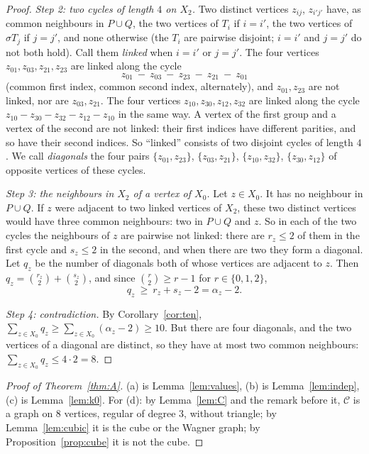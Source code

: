 \documentclass[11pt,a4paper]{article}
\theoremstyle{remark}
\newcommand{\sg}{\sigma}
\begin{document}
\begin{proof}
\medskip\noindent\emph{Step 2: two cycles of length $4$ on $X_2$.}
Two distinct vertices $z_{ij}$, $z_{i'j'}$ have, as common neighbours in $P\cup Q$, the two vertices of $T_i$ if
$i=i'$, the two vertices of $\sg T_j$ if $j=j'$, and none otherwise (the $T_i$ are pairwise disjoint; $i=i'$ and
$j=j'$ do not both hold). Call them \emph{linked} when $i=i'$ or $j=j'$. The four vertices
$z_{01},z_{03},z_{21},z_{23}$ are linked along the cycle
\[
z_{01}\ -\ z_{03}\ -\ z_{23}\ -\ z_{21}\ -\ z_{01}
\]
(common first index, common second index, alternately), and $z_{01},z_{23}$ are not linked, nor are
$z_{03},z_{21}$. The four vertices $z_{10},z_{30},z_{12},z_{32}$ are linked along the cycle
$z_{10}-z_{30}-z_{32}-z_{12}-z_{10}$ in the same way. A vertex of the first group and a vertex of the second are not
linked: their first indices have different parities, and so have their second indices. So ``linked'' consists of two
disjoint cycles of length $4$. We call \emph{diagonals} the four pairs
$\{z_{01},z_{23}\}$, $\{z_{03},z_{21}\}$, $\{z_{10},z_{32}\}$, $\{z_{30},z_{12}\}$ of opposite vertices of these
cycles.

\medskip\noindent\emph{Step 3: the neighbours in $X_2$ of a vertex of $X_0$.}
Let $z\in X_0$. It has no neighbour in $P\cup Q$. If $z$ were adjacent to two linked vertices of $X_2$, these two
distinct vertices would have three common neighbours: two in $P\cup Q$ and $z$. So in each of the two cycles the
neighbours of $z$ are pairwise not linked: there are $r_z\le2$ of them in the first cycle and $s_z\le2$ in the
second, and when there are two they form a diagonal. Let $q_z$ be the number of diagonals both of whose vertices are
adjacent to $z$. Then $q_z=\binom{r_z}2+\binom{s_z}2$, and since $\binom r2\ge r-1$ for $r\in\{0,1,2\}$,
\[
q_z\ \ge\ r_z+s_z-2=\alpha_z-2 .
\]

\medskip\noindent\emph{Step 4: contradiction.}
By Corollary~\ref{cor:ten}, $\sum_{z\in X_0}q_z\ge\sum_{z\in X_0}(\alpha_z-2)\ge10$. But there are four diagonals,
and the two vertices of a diagonal are distinct, so they have at most two common neighbours:
$\sum_{z\in X_0}q_z\le4\cdot2=8$.
\end{proof}

\begin{proof}[Proof of Theorem~\ref{thm:A}]
(a) is Lemma~\ref{lem:values}, (b) is Lemma~\ref{lem:indep}, (c) is Lemma~\ref{lem:k0}. For (d): by
Lemma~\ref{lem:C} and the remark before it, $\mathcal C$ is a graph on $8$ vertices, regular of degree $3$, without
triangle; by Lemma~\ref{lem:cubic} it is the cube or the Wagner graph; by Proposition~\ref{prop:cube} it is not the
cube.
\end{proof}
\end{document}
